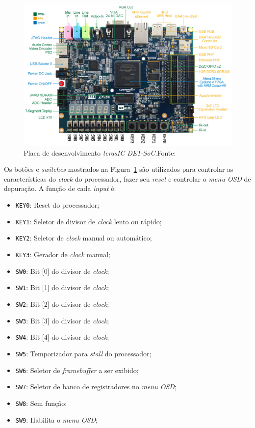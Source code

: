     \begin{figure}[H]
    \centering
        \includegraphics[width=.9\linewidth]{../images/fpga/de1_soc_subs.png}
        \caption[Placa de desenvolvimento \textit{terasIC DE1-SoC}.]{Placa de
        desenvolvimento \textit{terasIC DE1-SoC}.\quad Fonte:~\cite{terasic_de1_soc}}
        \label{fig:de1_soc}
    \end{figure}

    { Os botões e \textit{switches} mostrados na Figura~\ref{fig:de1_soc} são
        utilizados para controlar as características do \textit{clock} do
        processador, fazer seu \textit{reset} e controlar o \textit{menu OSD}
        de depuração. A função de cada \textit{input} é:
    }
    \begin{itemize}
        \item \texttt{KEY0}: Reset do processador;
        \item \texttt{KEY1}: Seletor de divisor de \textit{clock} lento ou rápido;
        \item \texttt{KEY2}: Seletor de \textit{clock} manual ou automático;
        \item \texttt{KEY3}: Gerador de \textit{clock} manual;
        \item \texttt{SW0}: Bit [0] do divisor de \textit{clock};
        \item \texttt{SW1}: Bit [1] do divisor de \textit{clock};
        \item \texttt{SW2}: Bit [2] do divisor de \textit{clock};
        \item \texttt{SW3}: Bit [3] do divisor de \textit{clock};
        \item \texttt{SW4}: Bit [4] do divisor de \textit{clock};
        \item \texttt{SW5}: Temporizador para \textit{stall} do processador;
        \item \texttt{SW6}: Seletor de \textit{framebuffer} a ser exibido;
        \item \texttt{SW7}: Seletor de banco de registradores no \textit{menu OSD};
        \item \texttt{SW8}: Sem função;
        \item \texttt{SW9}: Habilita o \textit{menu OSD};
    \end{itemize}

